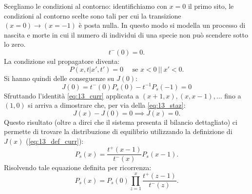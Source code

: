 Scegliamo le condizioni al contorno: identifichiamo con $x=0$ il primo sito, le condizioni al contorno scelte sono tali per cui la transizione $(x=0)\to (x=-1) $ è posta nulla. In questo modo si modella un processo di nascita e morte in cui il numero di individui di una specie non può scendere sotto lo zero.
\[
    t^-(0) = 0
.\] 
La condizione sul propagatore diventa:
\[
    P\left(x,t|x',t'\right) = 0 \quad \text{ se } x < 0 \ || \ x' < 0
.\] 
Si hanno quindi delle conseguenze su $J(0)$:
\begin{equation}
    J(0) = t^-(0) P_s(0) - t^{-1}P_s(-1) = 0 \label{eq:13_staz}
\end{equation}
Sfruttando l'identità \ref{eq:13_curr} applicata a $(x+1,x),(x,x-1),\ldots$ fino a $(1,0)$ si arriva a dimostrare che, per via della \ref{eq:13_staz}:
\[
    J(x) - J(0) = 0 \implies  J(x) = 0
.\] 
Questo risultato (oltre a dirci che il sistema presenta il bilancio dettagliato) ci permette di trovare la distribuzione di equilibrio utilizzando la definizione di $J(x)$ (\ref{eq:13_def_curr}): 
\[
    P_s(x) = \frac{t^+(x-1)}{t^-(x)}P_s(x-1) 
.\] 
Risolvendo tale equazione definita per ricorrenza:
\[
    P_s(x) = P_s(0) \prod_{z=1}^{x} \frac{t^+(z-1)}{t^-(z)} 
.\] 
